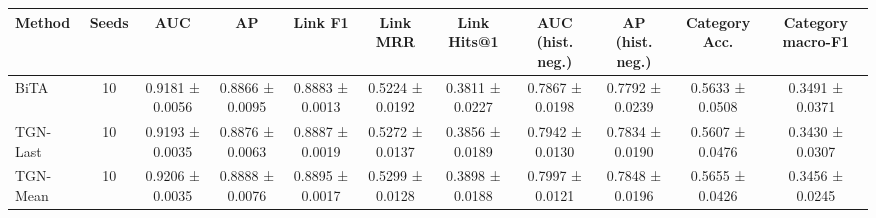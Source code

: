 \begin{tabular}{lcccccccccc}
\toprule
Method & Seeds & AUC & AP & Link F1 & Link MRR & Link Hits@1 & AUC (hist. neg.) & AP (hist. neg.) & Category Acc. & Category macro-F1 \\
\midrule
BiTA & 10 & 0.9181 ± 0.0056 & 0.8866 ± 0.0095 & 0.8883 ± 0.0013 & 0.5224 ± 0.0192 & 0.3811 ± 0.0227 & 0.7867 ± 0.0198 & 0.7792 ± 0.0239 & 0.5633 ± 0.0508 & 0.3491 ± 0.0371 \\
TGN-Last & 10 & 0.9193 ± 0.0035 & 0.8876 ± 0.0063 & 0.8887 ± 0.0019 & 0.5272 ± 0.0137 & 0.3856 ± 0.0189 & 0.7942 ± 0.0130 & 0.7834 ± 0.0190 & 0.5607 ± 0.0476 & 0.3430 ± 0.0307 \\
TGN-Mean & 10 & 0.9206 ± 0.0035 & 0.8888 ± 0.0076 & 0.8895 ± 0.0017 & 0.5299 ± 0.0128 & 0.3898 ± 0.0188 & 0.7997 ± 0.0121 & 0.7848 ± 0.0196 & 0.5655 ± 0.0426 & 0.3456 ± 0.0245 \\
\bottomrule
\end{tabular}
